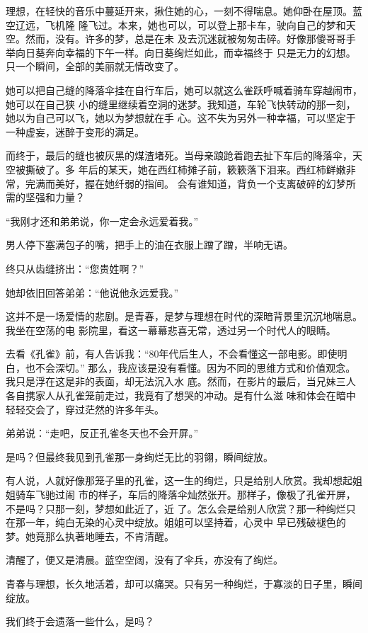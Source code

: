 \documentclass[12pt,a4paper]{article}
\begin{document}
		理想，在轻快的音乐中蔓延开来，揪住她的心，一刻不得喘息。她仰卧在屋顶。蓝空辽远，飞机隆
	隆飞过。本来，她也可以，可以登上那卡车，驶向自己的梦和天空。然而，没有。许多的梦，总是在未
	及去沉迷就被匆匆击碎。好像那傻哥哥手举向日葵奔向幸福的下午一样。向日葵绚烂如此，而幸福终于
	只是无力的幻想。只一个瞬间，全部的美丽就无情改变了。

		她可以把自己缝的降落伞挂在自行车后，她可以就这么雀跃呼喊着骑车穿越闹市，她可以在自己狭
	小的缝里继续着空洞的迷梦。我知道，车轮飞快转动的那一刻，她以为自己可以飞，她以为梦想就在手
	心。这不失为另外一种幸福，可以坚定于一种虚妄，迷醉于变形的满足。

		而终于，最后的缝也被灰黑的煤渣堵死。当母亲踉跄着跑去扯下车后的降落伞，天空被撕破了。多
	年后的某天，她在西红柿摊子前，簌簌落下泪来。西红柿鲜嫩非常，完满而美好，握在她纤弱的指间。
	会有谁知道，背负一个支离破碎的幻梦所需的坚强和力量？

		“我刚才还和弟弟说，你一定会永远爱着我。”

		男人停下塞满包子的嘴，把手上的油在衣服上蹭了蹭，半响无语。

		终只从齿缝挤出：“您贵姓啊？”

		她却依旧回答弟弟：“他说他永远爱我。”

		这并不是一场爱情的悲剧。是青春，是梦与理想在时代的深暗背景里沉沉地喘息。我坐在空荡的电
	影院里，看这一幕幕悲喜无常，透过另一个时代人的眼睛。

		去看《孔雀》前，有人告诉我：“80年代后生人，不会看懂这一部电影。即使明白，也不会深切。”
	那么，我应该是没有看懂。因为不同的思维方式和价值观念。我只是浮在这是非的表面，却无法沉入水
	底。然而，在影片的最后，当兄妹三人各自携家人从孔雀笼前走过，我竟有了想哭的冲动。是有什么滋
	味和体会在暗中轻轻交会了，穿过茫然的许多年头。

		弟弟说：“走吧，反正孔雀冬天也不会开屏。”

		是吗？但最终我见到孔雀那一身绚烂无比的羽翎，瞬间绽放。

		有人说，人就好像那笼子里的孔雀，这一生的绚烂，只是给别人欣赏。我却想起姐姐骑车飞驰过闹
	市的样子，车后的降落伞灿然张开。那样子，像极了孔雀开屏，不是吗？只那一刻，梦想如此近了，近
	了。怎么会是给别人欣赏？那一种绚烂只在那一年，纯白无染的心灵中绽放。姐姐可以坚持着，心灵中
	早已残破褪色的梦。她竟那么执著地睡去，不肯清醒。

		清醒了，便又是清晨。蓝空空阔，没有了伞兵，亦没有了绚烂。

		青春与理想，长久地活着，却可以痛哭。只有另一种绚烂，于寡淡的日子里，瞬间绽放。

		我们终于会遗落一些什么，是吗？
\end{document}
